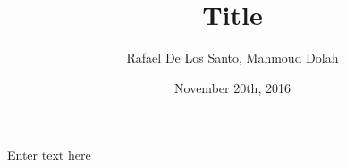 \documentclass{article}
\title{Title}
\author{Rafael De Los Santo, Mahmoud Dolah}
\date{November 20th, 2016}
\begin{document}
\maketitle
Enter text here
\end{document}

